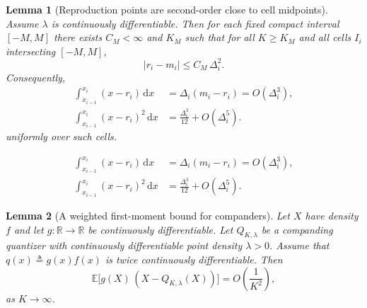 \documentclass[10pt,a4paper]{amsart}
\newtheorem{lemma}{Lemma}
\newcommand{\E}{\mathbb{E}}
\newcommand{\R}{\mathbb{R}}
\newcommand{\abs}[1]{\left\lvert #1 \right\rvert}
\newcommand{\defeq}{\triangleq}
\begin{document}
\begin{lemma}[Reproduction points are second-order close to cell midpoints]\label{lem:r_midpoint}
Assume $\lambda$ is continuously differentiable. Then for each fixed compact interval $[-M,M]$ there exists $C_M<\infty$ and $K_M$ such that for all $K\ge K_M$ and all cells $I_i$ intersecting $[-M,M]$,
\begin{equation}\label{eq:r_minus_m}
\abs{r_i-m_i}\le C_M\,\Delta_i^2.
\end{equation}
Consequently,
\begin{equation}\label{eq:first_second_moment_id}
\begin{aligned}
\int_{x_{i-1}}^{x_i} (x-r_i)\, \mathrm{d}x
&= \Delta_i(m_i-r_i)=O(\Delta_i^3), \\
\int_{x_{i-1}}^{x_i} (x-r_i)^2\, \mathrm{d}x
&= \frac{\Delta_i^3}{12}+O(\Delta_i^5).
\end{aligned}
\end{equation}
uniformly over such cells.
\end{lemma}

\begin{equation}
\begin{aligned}
\int_{x_{i-1}}^{x_i} (x-r_i)\, \mathrm{d}x
&= \Delta_i(m_i-r_i)=O(\Delta_i^3), \\
\int_{x_{i-1}}^{x_i} (x-r_i)^2\, \mathrm{d}x
&= \frac{\Delta_i^3}{12}+O(\Delta_i^5).
\end{aligned}
\end{equation}

\begin{lemma}[A weighted first-moment bound for companders]\label{lem:first_moment}
Let $X$ have density $f$ and let $g:\R\to\R$ be continuously differentiable. Let $Q_{K,\lambda}$ be a companding quantizer with continuously differentiable point density $\lambda>0$.
Assume that $q(x)\defeq g(x)f(x)$ is twice continuously differentiable.
Then
\begin{equation}\label{eq:first_moment_order}
\E\big[g(X)\,(X-Q_{K,\lambda}(X))\big]=O\!\left(\frac{1}{K^2}\right),
\end{equation}
as $K\to\infty$.
\end{lemma}
\end{document}
